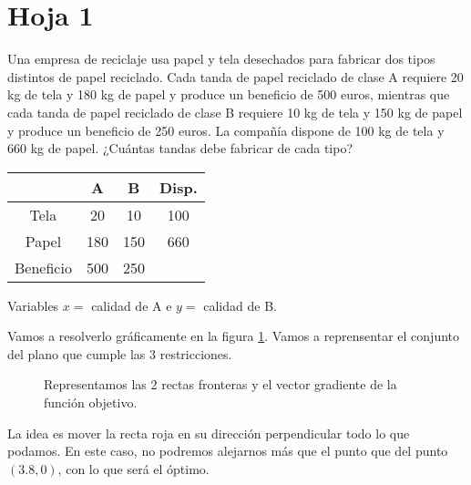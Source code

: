 
\section{Hoja 1}

\begin{problem}[1]

Una empresa de reciclaje usa papel y tela desechados para fabricar dos tipos distintos de papel reciclado.
Cada tanda de papel reciclado de clase A requiere 20 kg de tela y 180 kg de papel y produce un beneficio de 500 euros, mientras que cada tanda de papel reciclado de clase B requiere 10 kg de tela y 150 kg de papel y produce un beneficio de 250 euros. 
La compañía dispone de 100 kg de tela y 660 kg de papel. ¿Cuántas tandas debe fabricar de cada tipo?

\solution

\begin{center}
\begin{tabular}{c|ccc}
& A & B & Disp. \\\hline
Tela & 20 & 10 & 100\\
Papel & 180 & 150 & 660\\
Beneficio & 500 & 250 & 
\end{tabular}
\end{center}

Variables $x = $ calidad de A e $y = $ calidad de B.

\begin{ioprob}
\end{ioprob}

Vamos a resolverlo gráficamente en la figura \ref{ej:1.1.a}. Vamos a reprensentar el conjunto del plano que cumple las 3 restricciones.


\begin{figure}[hbtp]
\centering
{}
\label{ej:1.1.a}
\caption{Representamos las 2 rectas fronteras y el vector gradiente de la función objetivo.}
\end{figure}


La idea es mover la recta roja en su dirección perpendicular todo lo que podamos. En este caso, no podremos alejarnos más que el punto que del punto $(3.8,0)$, con lo que será el óptimo.

\end{problem}


